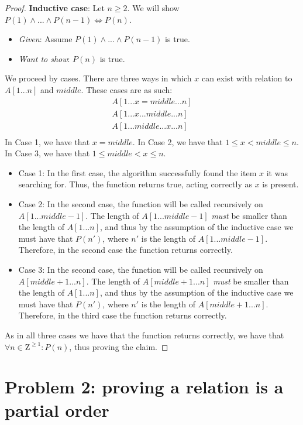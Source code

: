 \documentclass[titlepage]{article}
\begin{document}
\begin{proof}
\textbf{Inductive case}: Let $n \geq 2$.  We will show $P(1) \land ... \land P(n-1) \iff P(n)$.
\begin{itemize}
\item \emph{Given}: Assume $P(1) \land ... \land P(n-1)$ is true.
\item \emph{Want to show}: $P(n)$ is true.
\end{itemize}
We proceed by cases. There are three ways in which $x$ can exist with relation to $A[1...n]$ and $middle$. These cases are as such:
\begin{align*}
A[1...x=middle...n] \\
A[1...x...middle...n] \\
A[1...middle...x...n] \\
\end{align*}
In Case 1, we have that $x = middle$. In Case 2, we have that $1 \leq x < middle \leq n$. In Case 3, we have that $1 \leq middle < x \leq n$.
\begin{itemize}
\item {Case 1}: In the first case, the algorithm successfully found the item $x$ it was searching for. Thus, the function returns true, acting correctly as $x$ is present.
\item {Case 2}: In the second case, the function will be called recursively on $A[1...middle-1]$. The length of $A[1...middle-1]$ \emph{must} be smaller than the length of $A[1...n]$, and thus by the assumption of the inductive case we must have that $P(n')$, where $n'$ is the length of $A[1...middle-1]$. Therefore, in the second case the function returns correctly.
\item {Case 3}: In the second case, the function will be called recursively on $A[middle+1...n]$. The length of $A[middle+1...n]$ \emph{must} be smaller than the length of $A[1...n]$, and thus by the assumption of the inductive case we must have that $P(n')$, where $n'$ is the length of $A[middle+1...n]$. Therefore, in the third case the function returns correctly.
\end{itemize}
As in all three cases we have that the function returns correctly, we have that $\forall n \in \mathrm{Z}^{\geq 1}: P(n)$, thus proving the claim.

\end{proof}

\section{Problem 2: proving a relation is a partial order}
\end{document}
